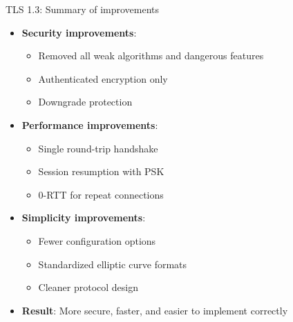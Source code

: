\documentclass[aspectratio=169, lualatex, handout]{beamer}
\begin{document}
\begin{frame}{TLS 1.3: Summary of improvements}
	\begin{itemize}[<+->]
		\item \textbf{Security improvements}:
		      \begin{itemize}
			      \item Removed all weak algorithms and dangerous features
			      \item Authenticated encryption only
			      \item Downgrade protection
		      \end{itemize}
		\item \textbf{Performance improvements}:
		      \begin{itemize}
			      \item Single round-trip handshake
			      \item Session resumption with PSK
			      \item 0-RTT for repeat connections
		      \end{itemize}
		\item \textbf{Simplicity improvements}:
		      \begin{itemize}
			      \item Fewer configuration options
			      \item Standardized elliptic curve formats
			      \item Cleaner protocol design
		      \end{itemize}
		\item \textbf{Result}: More secure, faster, and easier to implement correctly
	\end{itemize}
\end{frame}
\end{document}

